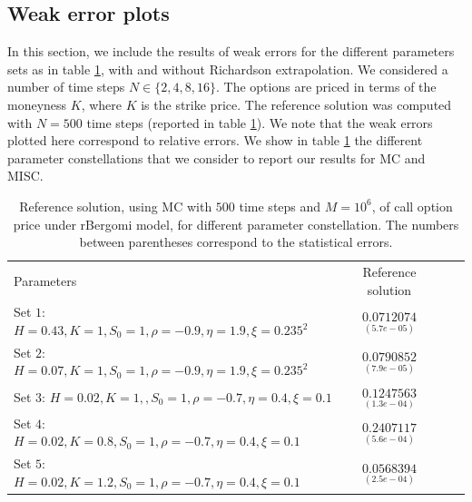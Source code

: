 	
	











\subsection{Weak error plots} \label{sec:Weak error plots_no_change}
In this section, we include the results of weak errors for the different parameters sets as in table \ref{table:Reference solution, using MC with $500$ time steps, of Call option price under rBergomi model, for different parameter constellation.}, with and without Richardson extrapolation.  We considered a number of time steps $N \in \{2,4,8,16\}$.  The options are priced in terms of the moneyness $K$, where $K$ is the strike price.  The reference solution was computed with $N=500$ time steps (reported in table \ref{table:Reference solution, using MC with $500$ time steps, of Call option price under rBergomi model, for different parameter constellation.}). We note that the weak errors plotted here correspond to relative errors. We show in table \ref{table:Reference solution, using MC with $500$ time steps, of Call option price under rBergomi model, for different parameter constellation.} the different parameter constellations that we consider to report our results for MC and MISC.



\begin{table}[!h]
	\centering
	\begin{tabular}{l*{2}{c}r}
		Parameters            & Reference solution    \\
	Set $1$:	$H=0.43, K=1,S_0=1, \rho=-0.9, \eta=1.9,\xi=0.235^2$   & $\underset{(5.7e-05)}{0.0712074}$  \\	
			Set $2$:	$H=0.07, K=1,S_0=1, \rho=-0.9, \eta=1.9,\xi=0.235^2$   & $\underset{(7.9e-05)}{0.0790852}$  \\	

				Set $3$:	$H=0.02, K=1,,S_0=1, \rho=-0.7, \eta=0.4,\xi=0.1$   & $\underset{(1.3e-04)}{0.1247563}$  \\
					Set $4$:	$H=0.02, K=0.8,S_0=1, \rho=-0.7, \eta=0.4,\xi=0.1$   & $\underset{(5.6e-04)}{0.2407117}$  \\
						Set $5$:	$H=0.02, K=1.2,S_0=1, \rho=-0.7, \eta=0.4,\xi=0.1$   & $\underset{(2.5e-04)}{0.0568394}$  \\
		\hline
	\end{tabular}
	\caption{Reference solution, using MC with $500$ time steps and $M=10^6$, of call option price under rBergomi model, for different parameter constellation.  The numbers between parentheses correspond to the statistical errors.}
	\label{table:Reference solution, using MC with $500$ time steps, of Call option price under rBergomi model, for different parameter constellation.}
\end{table}
\FloatBarrier



